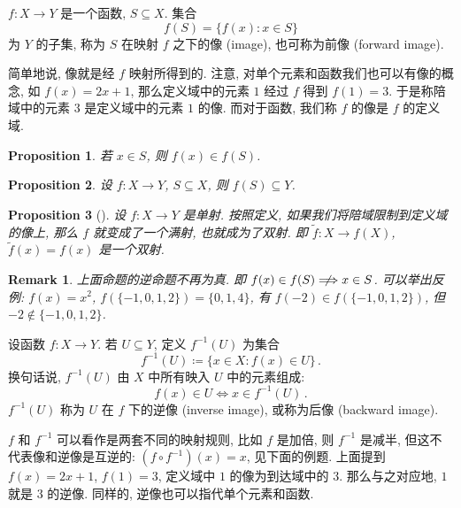 \documentclass[UTF8]{ctexart}
\theoremstyle{mystyle}
\newtheorem{proposition}{Proposition}[section]
\theoremstyle{myremark}
\newtheorem*{remark}{Remark}
\theoremstyle{plain}
\newcommand{\set}[1]{\{#1\}}
\begin{document}
\begin{definition}
    $ f \colon X \to Y $ 是一个函数, $ S \subseteq X $. 集合 \[ f(S) = \set{f(x) \colon x \in S} \] 为 $ Y $ 的子集, 称为 $ S $ 在映射 $ f $ 之下的像 (image), 也可称为前像 (forward image).
\end{definition}

简单地说, 像就是经 $ f $ 映射所得到的. 注意, 对单个元素和函数我们也可以有像的概念, 如 $ f(x) = 2x + 1 $, 那么定义域中的元素 $ 1 $ 经过 $ f $ 得到 $ f(1) = 3 $. 于是称陪域中的元素 $ 3 $ 是定义域中的元素 $ 1 $ 的像. 而对于函数, 我们称 $ f $ 的像是 $ f $ 的定义域.

\begin{proposition}
    若 $ x \in S $, 则 $ f(x) \in f(S) $.
\end{proposition}

\begin{proposition}
    设 $ f \colon X \to Y $, $ S \subseteq X $, 则 $ f(S) \subseteq Y $.
\end{proposition}

\begin{proposition}[]
    设 $ f \colon X \to Y $ 是单射. 按照定义, 如果我们将陪域限制到定义域的像上, 那么 $ f $ 就变成了一个满射, 也就成为了双射. 即 $ \widetilde{f} \colon X \to f(X) $, $ \widetilde{f}(x) = f(x) $ 是一个双射.
\end{proposition}

\begin{remark}
    上面命题的逆命题不再为真. 即 $ f(x) \in f(S) \centernot \Longrightarrow x \in S $. 可以举出反例: $ f(x) = x^2 $, $ f(\set{-1, 0, 1, 2}) = \set{0, 1, 4} $, 有 $ f(-2) \in f(\set{-1, 0, 1, 2}) $, 但 $ -2 \not\in \set{-1, 0, 1, 2} $.
\end{remark}

\begin{definition}[\text{逆像}]
    设函数 $ f \colon X \to Y $. 若 $ U \subseteq Y $, 定义 $ f^{-1} (U) $ 为集合 \[ f ^{-1} (U) \coloneqq \set{x \in X \colon f(x) \in U} \,.\]
    换句话说, $ f^{-1}(U) $ 由 $ X $ 中所有映入 $ U $ 中的元素组成: \[ f(x) \in U \Longleftrightarrow x \in f^{-1}(U) \,.\] $ f^{-1}(U) $ 称为 $ U $ 在 $ f $ 下的逆像 (inverse image), 或称为后像 (backward image).
\end{definition}

$ f $ 和 $ f^{-1} $ 可以看作是两套不同的映射规则, 比如 $ f $ 是加倍, 则 $ f^{-1} $ 是减半, 但这不代表像和逆像是互逆的: $ (f \circ f^{-1})(x) = x $, 见下面的例题. 上面提到 $ f(x) = 2 x + 1 $, $ f(1) = 3 $, 定义域中 $ 1 $ 的像为到达域中的 $ 3 $. 那么与之对应地, $ 1 $ 就是 $ 3 $ 的逆像. 同样的, 逆像也可以指代单个元素和函数.
\end{document}
